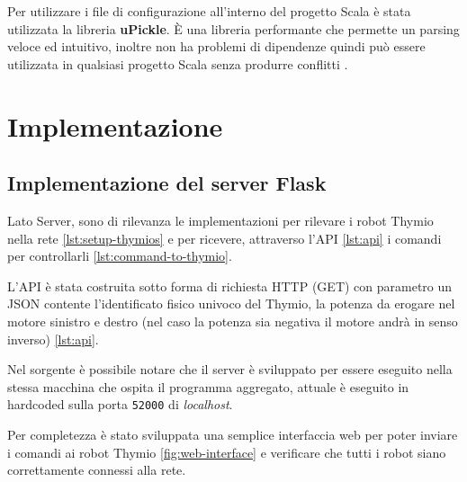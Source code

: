 \documentclass[12pt,a4paper,openright,twoside]{book}
\begin{document}
Per utilizzare i file di configurazione all'interno del progetto Scala è stata utilizzata la libreria \textbf{uPickle}. È una libreria performante che permette un parsing veloce ed intuitivo, inoltre non ha problemi di dipendenze quindi può essere utilizzata in qualsiasi progetto Scala senza produrre conflitti \cite{uPickle}.

\chapter{Implementazione}
\label{chap:implementazione}

\section{Implementazione del server Flask}

Lato Server, sono di rilevanza le implementazioni per rilevare i robot Thymio nella rete \cref{lst:setup-thymios} e per ricevere, attraverso l'API \cref{lst:api} i comandi per controllarli \cref{lst:command-to-thymio}.



L'API è stata costruita sotto forma di richiesta HTTP (GET) con parametro un JSON contente l'identificato fisico univoco del Thymio, la potenza da erogare nel motore sinistro e destro (nel caso la potenza sia negativa il motore andrà in senso inverso) \cref{lst:api}.

Nel sorgente è possibile notare che il server è sviluppato per essere eseguito nella stessa macchina che ospita il programma aggregato, attuale è eseguito in hardcoded sulla porta \verb|52000| di \textit{localhost}.





Per completezza è stato sviluppata una semplice interfaccia web per poter inviare i comandi ai robot Thymio \cref{fig:web-interface} e verificare che tutti i robot siano correttamente connessi alla rete.
\end{document}
